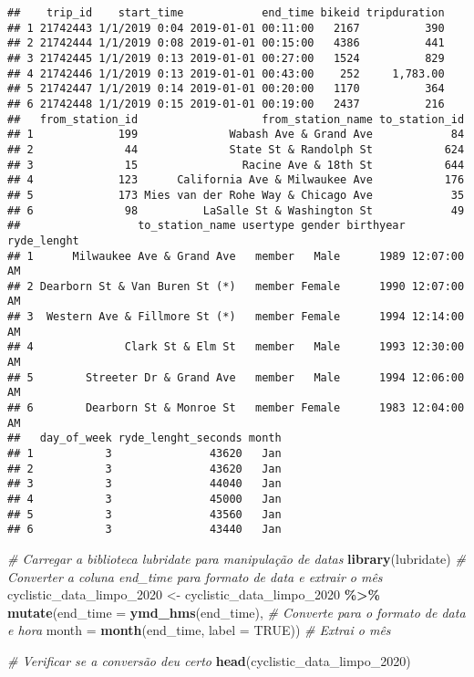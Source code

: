 \documentclass[
]{article}
\newenvironment{Shaded}{\begin{snugshade}}{\end{snugshade}}
\newcommand{\AttributeTok}[1]{\textcolor[rgb]{0.13,0.29,0.53}{#1}}
\newcommand{\CommentTok}[1]{\textcolor[rgb]{0.56,0.35,0.01}{\textit{#1}}}
\newcommand{\ConstantTok}[1]{\textcolor[rgb]{0.56,0.35,0.01}{#1}}
\newcommand{\FunctionTok}[1]{\textcolor[rgb]{0.13,0.29,0.53}{\textbf{#1}}}
\newcommand{\NormalTok}[1]{#1}
\newcommand{\OtherTok}[1]{\textcolor[rgb]{0.56,0.35,0.01}{#1}}
\newcommand{\SpecialCharTok}[1]{\textcolor[rgb]{0.81,0.36,0.00}{\textbf{#1}}}
\begin{document}
\begin{verbatim}
##    trip_id    start_time            end_time bikeid tripduration
## 1 21742443 1/1/2019 0:04 2019-01-01 00:11:00   2167          390
## 2 21742444 1/1/2019 0:08 2019-01-01 00:15:00   4386          441
## 3 21742445 1/1/2019 0:13 2019-01-01 00:27:00   1524          829
## 4 21742446 1/1/2019 0:13 2019-01-01 00:43:00    252     1,783.00
## 5 21742447 1/1/2019 0:14 2019-01-01 00:20:00   1170          364
## 6 21742448 1/1/2019 0:15 2019-01-01 00:19:00   2437          216
##   from_station_id                   from_station_name to_station_id
## 1             199              Wabash Ave & Grand Ave            84
## 2              44              State St & Randolph St           624
## 3              15                Racine Ave & 18th St           644
## 4             123      California Ave & Milwaukee Ave           176
## 5             173 Mies van der Rohe Way & Chicago Ave            35
## 6              98          LaSalle St & Washington St            49
##                  to_station_name usertype gender birthyear ryde_lenght
## 1      Milwaukee Ave & Grand Ave   member   Male      1989 12:07:00 AM
## 2 Dearborn St & Van Buren St (*)   member Female      1990 12:07:00 AM
## 3  Western Ave & Fillmore St (*)   member Female      1994 12:14:00 AM
## 4              Clark St & Elm St   member   Male      1993 12:30:00 AM
## 5        Streeter Dr & Grand Ave   member   Male      1994 12:06:00 AM
## 6        Dearborn St & Monroe St   member Female      1983 12:04:00 AM
##   day_of_week ryde_lenght_seconds month
## 1           3               43620   Jan
## 2           3               43620   Jan
## 3           3               44040   Jan
## 4           3               45000   Jan
## 5           3               43560   Jan
## 6           3               43440   Jan
\end{verbatim}

\begin{Shaded}
\begin{Highlighting}[]
\CommentTok{\# Carregar a biblioteca lubridate para manipulação de datas}
\FunctionTok{library}\NormalTok{(lubridate)}
\CommentTok{\# Converter a coluna end\_time para formato de data e extrair o mês}
\NormalTok{cyclistic\_data\_limpo\_2020 }\OtherTok{\textless{}{-}}\NormalTok{ cyclistic\_data\_limpo\_2020 }\SpecialCharTok{\%\textgreater{}\%}
  \FunctionTok{mutate}\NormalTok{(}\AttributeTok{end\_time =} \FunctionTok{ymd\_hms}\NormalTok{(end\_time),  }\CommentTok{\# Converte para o formato de data e hora}
         \AttributeTok{month =} \FunctionTok{month}\NormalTok{(end\_time, }\AttributeTok{label =} \ConstantTok{TRUE}\NormalTok{))  }\CommentTok{\# Extrai o mês}

\CommentTok{\# Verificar se a conversão deu certo}
\FunctionTok{head}\NormalTok{(cyclistic\_data\_limpo\_2020)}
\end{Highlighting}
\end{Shaded}
\end{document}
